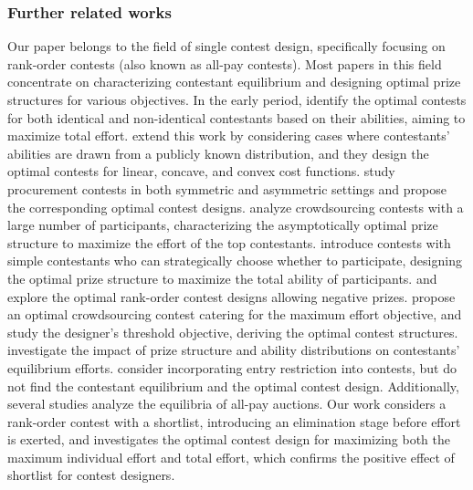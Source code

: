 \subsubsection{Further related works}
Our paper belongs to the field of single contest design, specifically focusing on rank-order contests (also known as all-pay contests). Most papers in this field concentrate on characterizing contestant equilibrium and designing optimal prize structures for various objectives.
In the early period, \cite{GH88} identify the optimal contests for both identical and non-identical contestants based on their abilities, aiming to maximize total effort. \cite{MS01} extend this work by considering cases where contestants' abilities are drawn from a publicly known distribution, and they design the optimal contests for linear, concave, and convex cost functions.
\cite{KG03} study procurement contests in both symmetric and asymmetric settings and propose the corresponding optimal contest designs. \cite{AS09} analyze crowdsourcing contests with a large number of participants, characterizing the asymptotically optimal prize structure to maximize the effort of the top contestants.
\cite{GK16} introduce contests with simple contestants who can strategically choose whether to participate, designing the optimal prize structure to maximize the total ability of participants. \cite{LLWZ18} and \cite{LL23} explore the optimal rank-order contest designs allowing negative prizes.
\cite{CHS19} propose an optimal crowdsourcing contest catering for the maximum effort objective, and \cite{EGG21} study the designer's threshold objective, deriving the optimal contest structures. \cite{G23} investigate the impact of prize structure and ability distributions on contestants' equilibrium efforts. 
\cite{SSYJ24} consider incorporating entry restriction into contests, but do not find the contestant equilibrium and the optimal contest design. 
Additionally, several studies \cite{BKV96, BK98, BKV12} analyze the equilibria of all-pay auctions.
Our work considers a rank-order contest with a shortlist, introducing an elimination stage before effort is exerted, and investigates the optimal contest design for maximizing both the maximum individual effort and total effort, which confirms the positive effect of shortlist for contest designers. 

